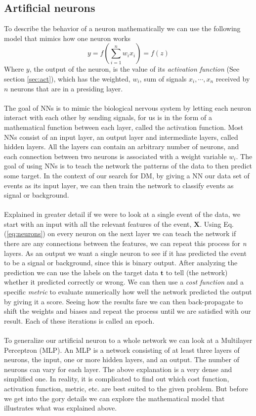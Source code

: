 \documentclass[12pt, a4paper]{book}
\begin{document}
\subsection{Artificial neurons}\label{sec:neurons}
To describe the behavior of a neuron mathematically we can use the following model that mimics how one neuron works
\begin{equation}\label{eq:neurons}
    y=f\left(\sum_{i=1}^{n}w_ix_i\right)=f(z)
\end{equation}
Where $y$, the output of the neuron, is the value of its \textit{activation function} (See section \ref{sec:act}), which has the weighted, $w_i$, sum of signals $x_i,\cdots,x_n$ received by $n$ neurons that are in a presiding layer.\\
\\The goal of NNs is to mimic the biological nervous system by letting each neuron interact with each other by sending signals, for us is in the form of a mathematical function between each layer, called the activation function. 
Most NNs consist of an input layer, an output layer and intermediate layers, called hidden layers. All the layers can contain an arbitrary number of neurons, and each connection between two neurons is associated with a weight variable $w_i$.
The goal of using NNs is to teach the network the patterns of the data to then predict some target. In the context of our search for DM, by giving a NN our data set of events as its input layer, we can then train the network to classify events as signal or background.\\
\\Explained in greater detail if we were to look at a single event of the data, we start with an input with all the relevant features of the event, $\bm X$. Using Eq. (\ref{eq:neurons}) on every neuron on the next layer we can teach the network if there 
are any connections between the features, we can repeat this process for \textit{n} layers. As an output we want a single neuron to see if it has predicted the event to be a signal or background, since this is binary output. After analyzing the prediction we can use the labels on the target data $\bm t$ 
to tell (the network) whether it predicted correctly or wrong. We can then use a \textit{cost function} and a specific \textit{metric} to evaluate numerically how well the network predicted the output by giving it a score. 
Seeing how the results fare we can then back-propagate to shift the weights and biases and repeat the process until we are satisfied with our result. Each of these iterations is called an epoch.\\
\\To generalize our artificial neuron to a whole network we can look at a Multilayer Perceptron (MLP). An MLP is a network consisting of at least three layers of neurons, the input, one or more hidden layers, and an output. 
The number of neurons can vary for each layer. The above explanation is a very dense and simplified one. In reality, it is complicated to find out which cost function, activation function, metric, etc. are best suited to the given problem. 
But before we get into the gory details we can explore the mathematical model that illustrates what was explained above. 
\end{document}
